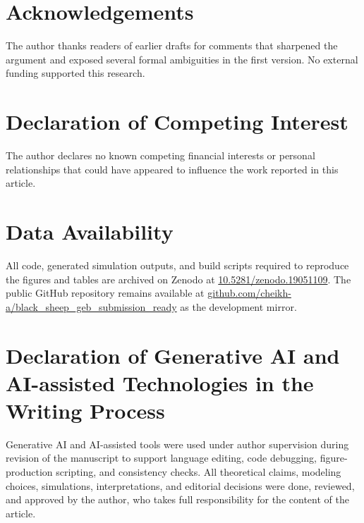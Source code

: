 \section*{Acknowledgements}

The author thanks readers of earlier drafts for comments that sharpened the argument and exposed several formal ambiguities in the first version. No external funding supported this research.

\section*{Declaration of Competing Interest}

The author declares no known competing financial interests or personal relationships that could have appeared to influence the work reported in this article.

\section*{Data Availability}

All code, generated simulation outputs, and build scripts required to reproduce the figures and tables are archived on Zenodo at \href{https://doi.org/10.5281/zenodo.19051109}{10.5281/zenodo.19051109}. The public GitHub repository remains available at \href{https://github.com/cheikh-a/black_sheep_geb_submission_ready}{github.com/cheikh-a/black\_sheep\_geb\_submission\_ready} as the development mirror.

\section*{Declaration of Generative AI and AI-assisted Technologies in the Writing Process}

Generative AI and AI-assisted tools were used under author supervision during revision of the manuscript to support language editing, code debugging, figure-production scripting, and consistency checks. All theoretical claims, modeling choices, simulations, interpretations, and editorial decisions were done, reviewed, and approved by the author, who takes full responsibility for the content of the article.
